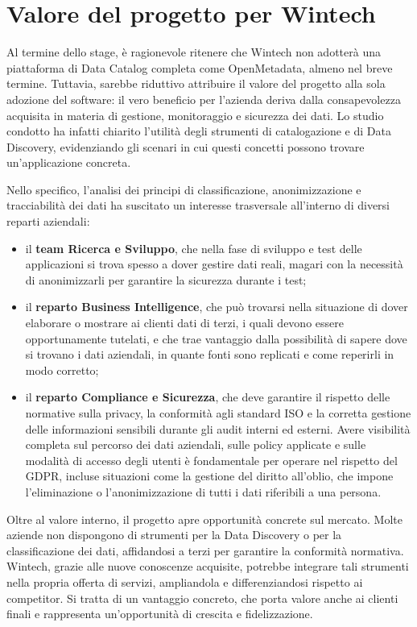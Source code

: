 \section{Valore del progetto per Wintech}
Al termine dello stage, è ragionevole ritenere che Wintech non adotterà una piattaforma di Data Catalog completa come OpenMetadata, almeno nel breve termine. 
Tuttavia, sarebbe riduttivo attribuire il valore del progetto alla sola adozione del software: il vero beneficio per l'azienda deriva dalla consapevolezza acquisita in materia di gestione, 
monitoraggio e sicurezza dei dati. Lo studio condotto ha infatti chiarito l'utilità degli strumenti di catalogazione e di Data Discovery, evidenziando gli scenari in cui questi concetti possono trovare un'applicazione concreta.

Nello specifico, l'analisi dei principi di classificazione, anonimizzazione e tracciabilità dei dati ha suscitato un interesse trasversale all'interno di diversi reparti aziendali:
\begin{itemize}
    \item il \textbf{team Ricerca e Sviluppo}, che nella fase di sviluppo e test delle applicazioni si trova spesso a dover gestire dati reali, magari con la necessità di anonimizzarli per garantire la sicurezza durante i test;
    \item il \textbf{reparto Business Intelligence}, che può trovarsi nella situazione di dover elaborare o mostrare ai clienti dati di terzi, i quali devono essere opportunamente tutelati, e che trae vantaggio dalla possibilità di sapere dove si trovano i dati aziendali, in quante fonti sono replicati e come reperirli in modo corretto;
    \item il \textbf{reparto Compliance e Sicurezza}, che deve garantire il rispetto delle normative sulla privacy, la conformità agli standard ISO e la corretta gestione delle informazioni sensibili durante gli audit interni ed esterni. Avere visibilità completa sul percorso dei dati aziendali, sulle policy applicate e sulle modalità di accesso degli utenti è fondamentale per operare nel rispetto del GDPR, incluse situazioni come la gestione del diritto all'oblio, che impone l'eliminazione o l'anonimizzazione di tutti i dati riferibili a una persona.
\end{itemize}

Oltre al valore interno, il progetto apre opportunità concrete sul mercato. Molte aziende non dispongono di strumenti per la Data Discovery o per la classificazione dei dati, 
affidandosi a terzi per garantire la conformità normativa. Wintech, grazie alle nuove conoscenze acquisite, potrebbe integrare tali strumenti nella propria offerta di servizi, 
ampliandola e differenziandosi rispetto ai competitor. Si tratta di un vantaggio concreto, che porta valore anche ai clienti finali e rappresenta un'opportunità di crescita e fidelizzazione.

